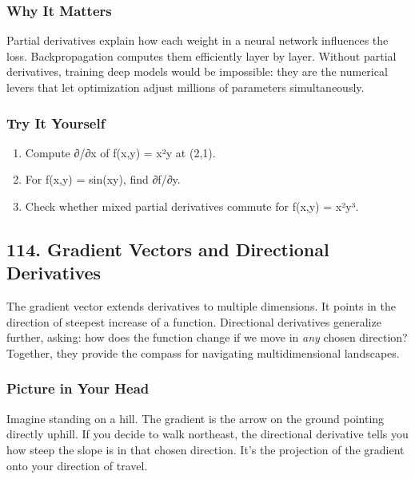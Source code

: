 \documentclass[
  letterpaper,
  DIV=11,
  numbers=noendperiod]{scrreprt}
\providecommand{\tightlist}{%
  \setlength{\itemsep}{0pt}\setlength{\parskip}{0pt}}
\begin{document}
\subsubsection{Why It Matters}\label{why-it-matters-10}

Partial derivatives explain how each weight in a neural network
influences the loss. Backpropagation computes them efficiently layer by
layer. Without partial derivatives, training deep models would be
impossible: they are the numerical levers that let optimization adjust
millions of parameters simultaneously.

\subsubsection{Try It Yourself}\label{try-it-yourself-112}

\begin{enumerate}
\def\labelenumi{\arabic{enumi}.}
\tightlist
\item
  Compute ∂/∂x of f(x,y) = x²y at (2,1).
\item
  For f(x,y) = sin(xy), find ∂f/∂y.
\item
  Check whether mixed partial derivatives commute for f(x,y) = x²y³.
\end{enumerate}

\subsection{114. Gradient Vectors and Directional
Derivatives}\label{gradient-vectors-and-directional-derivatives}

The gradient vector extends derivatives to multiple dimensions. It
points in the direction of steepest increase of a function. Directional
derivatives generalize further, asking: how does the function change if
we move in \emph{any} chosen direction? Together, they provide the
compass for navigating multidimensional landscapes.

\subsubsection{Picture in Your Head}\label{picture-in-your-head-113}

Imagine standing on a hill. The gradient is the arrow on the ground
pointing directly uphill. If you decide to walk northeast, the
directional derivative tells you how steep the slope is in that chosen
direction. It's the projection of the gradient onto your direction of
travel.
\end{document}
